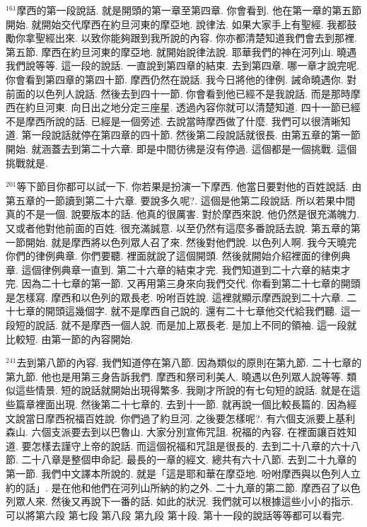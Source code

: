 \documentclass{book}
\begin{document}
$^{161}$摩西的第一段說話.
就是開頭的第一章至第四章.
你會看到.
他在第一章的第五節開始.
就開始交代摩西在約旦河東的摩亞地.
說律法.
如果大家手上有聖經.
我都鼓勵你拿聖經出來.
以致你能夠跟到我所說的內容.
你亦都清楚知道我們會去到那裡.
第五節.
摩西在約旦河東的摩亞地.
就開始說律法說.
耶華我們的神在河列山.
曉遇我們說等等.
這一段的說話.
一直說到第四章的結束.
去到第四章.
哪一章才說完呢.
你會看到第四章的第四十節.
摩西仍然在說話.
我今日將他的律例.
誡命曉遇你.
對前面的以色列人說話.
然後去到四十一節.
你會看到他已經不是我說話.
而是那時摩西在約旦河東.
向日出之地分定三座星.
透過內容你就可以清楚知道.
四十一節已經不是摩西所說的話.
已經是一個旁述.
去說當時摩西做了什麼.
我們可以很清晰知道.
第一段說話就停在第四章的四十節.
然後第二段說話就很長.
由第五章的第一節開始.
就涵蓋去到第二十六章.
即是中間彷彿是沒有停過.
這個都是一個挑戰.
這個挑戰就是.

$^{201}$等下節目你都可以試一下.
你若果是扮演一下摩西.
他當日要對他的百姓說話.
由第五章的一節讀到第二十六章.
要說多久呢?.
這個是他第二段說話.
所以若果中間真的不是一個.
說要版本的話.
他真的很厲害.
對於摩西來說.
他仍然是很充滿魄力.
又或者他對他前面的百姓.
很充滿誠意.
以至仍然有這麼多番說話去說.
第五章的第一節開始.
就是摩西將以色列眾人召了來.
然後對他們說.
以色列人啊.
我今天曉完你們的律例典章.
你們要聽.
裡面就說了這個開頭.
然後就開始介紹裡面的律例典章.
這個律例典章一直到.
第二十六章的結束才完.
我們知道到二十六章的結束才完.
因為二十七章的第一節.
又再用第三身來向我們交代.
你看到第二十七章的開頭是怎樣寫.
摩西和以色列的眾長老.
吩咐百姓說.
這裡就顯示摩西說到二十六章.
二十七章的開頭這幾個字.
就不是摩西自己說的.
還有二十七章他交代給我們聽.
這一段短的說話.
就不是摩西一個人說.
而是加上眾長老.
是加上不同的領袖.
這一段就比較短.
由第一節的內容開始.

$^{241}$去到第八節的內容.
我們知道停在第八節.
因為類似的原則在第九節.
二十七章的第九節.
他也是用第三身告訴我們.
摩西和祭司利美人.
曉遇以色列眾人說等等.
類似這些情景.
短的說話就開始出現得繁多.
我剛才所說的有七句短的說話.
就是在這些篇章裡面出現.
然後第二十七章的.
去到十一節.
就再說一個比較長篇的.
因為經文說當日摩西祝福百姓說.
你們過了約旦河.
之後要怎樣呢?.
有六個支派要上基利森山.
六個支派要去到以巴魯山.
大家分別宣佈咒詛.
祝福的內容.
在裡面讓百姓知道.
要怎樣去謹守上帝的說話.
而這個祝福和咒詛是很長的.
去到二十八章的六十八節.
二十八章是整個申命記.
最長的一章的經文.
總共有六十八節.
去到二十九章的第一節.
我們中文譯本所說的.
就是「這是耶和華在摩亞地.
吩咐摩西與以色列人立約的話」.
是在他和他們在河列山所納的約之外.
二十九章的第二節.
摩西召了以色列眾人來.
然後又再說下一番的話.
如此的狀況.
我們就可以根據這些小小的指示.
可以將第六段 第七段 第八段 第九段 第十段.
第十一段的說話等等都可以看完.
\end{document}
